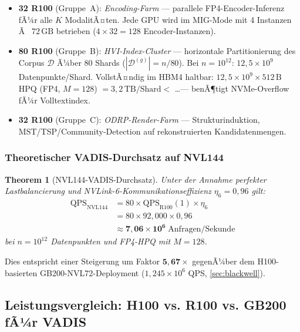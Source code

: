 ﻿\documentclass[12pt,a4paper]{article}
\newtheorem{theorem}{Theorem}[section]
\begin{document}
\begin{itemize}[leftmargin=1.4em, itemsep=2pt]
  \item \textbf{32 R100} (Gruppe~A): \emph{Encoding-Farm} ---
        parallele FP4-Encoder-Inferenz fÃ¼r alle $K$ ModalitÃ¤ten.
        Jede GPU wird im MIG-Mode mit 4 Instanzen Ã  $72\,\text{GB}$
        betrieben ($4 \times 32 = 128$ Encoder-Instanzen).
  \item \textbf{80 R100} (Gruppe~B): \emph{HVI-Index-Cluster} ---
        horizontale Partitionierung des Corpus
        $\mathcal{D}$ Ã¼ber 80 Shards ($|\mathcal{D}^{(g)}| = n/80$).
        Bei $n = 10^{12}$: $12{,}5 \times 10^9$ Datenpunkte/Shard.
        VollstÃ¤ndig im HBM4 haltbar: $12{,}5 \times 10^9 \times 512\,\text{B}$
        HPQ (FP4, $M=128$) $= 3{,}2\,\text{TB/Shard} <$ \ldots --- 
        benÃ¶tigt NVMe-Overflow fÃ¼r Volltextindex.
  \item \textbf{32 R100} (Gruppe~C): \emph{ODRP-Render-Farm} ---
        Strukturinduktion, MST/TSP/Communi\-ty-Detection
        auf rekonstruierten Kandidatenmengen.
\end{itemize}

\subsubsection{Theoretischer VADIS-Durchsatz auf NVL144}

\begin{theorem}[NVL144-VADIS-Durchsatz]
\label{thm:nvl144_throughput}
Unter der Annahme perfekter Lastbalancierung und
NVLink-6-Kommunikationseffizienz $\eta_6 = 0{,}96$ gilt:
\begin{align}
  \text{QPS}_{\text{NVL144}} &=
  80 \times \text{QPS}_{\text{R100}}(1) \times \eta_6 \\
  &= 80 \times 92{,}000 \times 0{,}96 \\
  &\approx \mathbf{7{,}06 \times 10^6}\;\text{Anfragen/Sekunde}
\end{align}
bei $n = 10^{12}$ Datenpunkten und FP4-HPQ mit $M=128$.
\end{theorem}

\noindent Dies entspricht einer Steigerung um Faktor $\mathbf{5{,}67\times}$
gegenÃ¼ber dem H100-basierten GB200-NVL72-Deployment
($1{,}245 \times 10^6$ QPS, \cref{sec:blackwell}).

\subsection{Leistungsvergleich: H100 vs. R100 vs. GB200 fÃ¼r VADIS}
\label{sub:r100_comparison}
\end{document}
